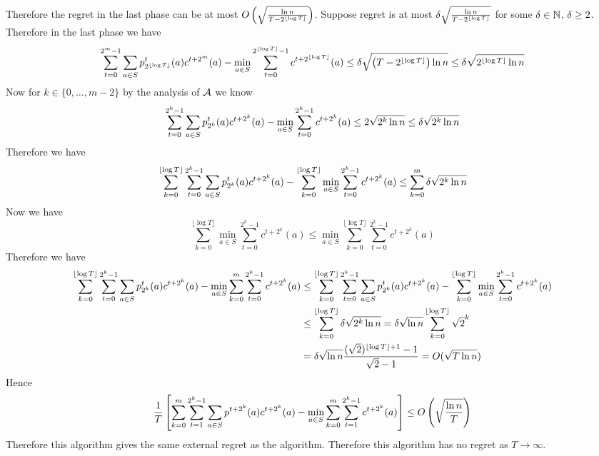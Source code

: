 \documentclass[a4paper, 11pt]{article}
\begin{document}
{Therefore the regret in the last phase can be at most $O\left(\sqrt{\frac{\ln n}{T-2^{\lfloor \log T\rfloor}}}\right)$. Suppose regret is at most $\delta\sqrt{\frac{\ln n}{T-2^{\lfloor \log T\rfloor}}}$ for some $\delta\in\mathbb{N}$, $\delta\geq 2$.  Therefore in the last phase we have $$\sum\limits_{t=0}^{2^m-1}\sum\limits_{a\in S}p_{2^{\lfloor \log T\rfloor}}^{t}(a)c^{t+2^m}(a)-\min_{a\in S}\sum_{t=0}^{2^{\lfloor \log T\rfloor}-1}c^{t+2^{\lfloor \log T\rfloor}}(a)\leq \delta\sqrt{\left(T-2^{\lfloor \log T\rfloor}\right)\ln n}\leq \delta\sqrt{2^{\lfloor \log T\rfloor}\ln n}$$Now for $k\in\{0,\dots, m-2\}$ by the analysis of $\mathcal{A}$ we know $$\sum\limits_{t=0}^{2^k-1}\sum\limits_{a\in S}p_{2^k}^{t}(a)c^{t+2^k}(a)-\min_{a\in S}\sum_{t=0}^{2^k-1}c^{t+2^k}(a)\leq 2\sqrt{2^k\ln n}\leq \delta\sqrt{2^k\ln n}$$Therefore we have $$\sum_{k=0}^{\lfloor \log T\rfloor} \sum\limits_{t=0}^{2^k-1}\sum\limits_{a\in S}p_{2^k}^{t}(a)c^{t+2^k}(a)-\sum_{k=0}^{\lfloor \log T\rfloor} \min_{a\in S}\sum_{t=0}^{2^k-1}c^{t+2^k}(a)\leq \sum_{k=0}^m \delta\sqrt{2^k\ln n}$$Now we have $$\sum_{k=0}^{\lfloor \log T\rfloor} \min_{a\in S}\sum_{t=0}^{2^k-1}c^{t+2^k}(a)\leq \min_{a\in S}\sum_{k=0}^{\lfloor \log T\rfloor} \sum_{t=0}^{2^k-1}c^{t+2^k}(a)$$Therefore we have \begin{align*}
	\sum_{k=0}^{\lfloor \log T\rfloor} \sum\limits_{t=0}^{2^k-1}\sum\limits_{a\in S}p_{2^k}^{t}(a)c^{t+2^k}(a)-\min_{a\in S}\sum_{k=0}^m \sum_{t=0}^{2^k-1}c^{t+2^k}(a) & \leq \sum_{k=0}^{\lfloor \log T\rfloor} \sum\limits_{t=0}^{2^k-1}\sum\limits_{a\in S}p_{2^k}^{t}(a)c^{t+2^k}(a)-\sum_{k=0}^{\lfloor \log T\rfloor} \min_{a\in S}\sum_{t=0}^{2^k-1}c^{t+2^k}(a) \\
	                                                                                                                                            & \leq \sum_{k=0}^{\lfloor \log T\rfloor} \delta\sqrt{2^k\ln n}= \delta\sqrt{\ln n}\sum_{k=0}^{\lfloor \log T\rfloor}\sqrt{2}^k                                                                                                            \\
	                                                                                                                                            & =\delta\sqrt{\ln n}\frac{(\sqrt{2})^{\lfloor \log T\rfloor+1}-1}{\sqrt{2}-1}=O(\sqrt{T\ln n})
\end{align*}
Hence $$\frac1T\left[	\sum_{k=0}^m \sum\limits_{t=1}^{2^k-1}\sum\limits_{a\in S}p^{t+2^k}(a)c^{t+2^k}(a)-\min_{a\in S}\sum_{k=0}^m \sum_{t=1}^{2^k-1}c^{t+2^k}(a)\right]\leq O\left(\sqrt{\frac{\ln n}T}\right)$$Therefore this algorithm gives the same external regret as the algorithm. Therefore this algorithm has no regret as $T\to\infty$.
}
\end{document}
